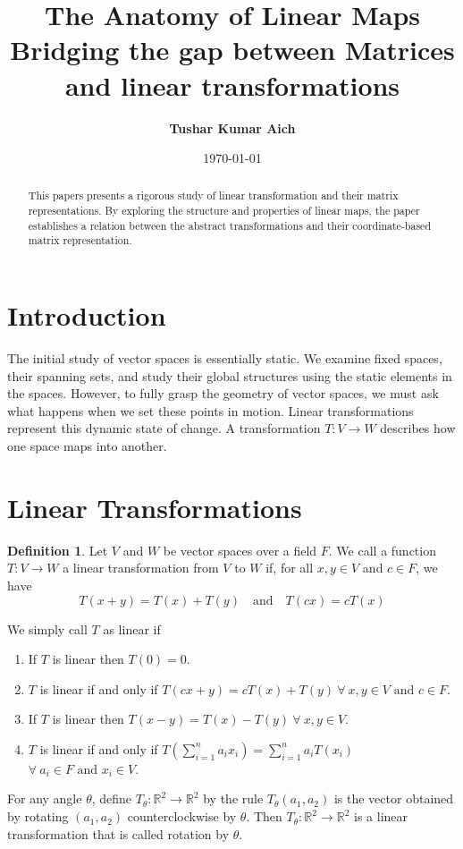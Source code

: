 \documentclass[12pt, a4paper]{article}
\title{\textbf{\Large The Anatomy of Linear Maps \\ \large Bridging the gap between Matrices and linear transformations}}
\author{\textbf{Tushar Kumar Aich}}
\date{\today}
\theoremstyle{definition}
\newtheorem{definition}{Definition}[section]
\theoremstyle{remark}
\begin{document}
\maketitle

\begin{abstract}
    This papers presents a rigorous study of linear transformation and their matrix representations. By exploring the structure and properties of linear maps, the paper establishes a relation between the abstract transformations and their coordinate-based matrix representation.
\end{abstract}

\section{Introduction}
The initial study of vector spaces is essentially static. We examine fixed spaces, their spanning sets, and study their global structures using the static elements in the spaces. However, to fully grasp the geometry of vector spaces, we must ask what happens when we set these points in motion. Linear transformations represent this dynamic state of change. A transformation $T: V \to W$ describes how one space maps into another.

\section{Linear Transformations}
\begin{definition}
    Let $V$ and $W$ be vector spaces over a field $F$. We call a function $T:V \to W$ a linear transformation from $V$ to $W$ if, for all $x,y \in V$ and $c \in F$, we have
    \[
    T(x+y) = T(x)+T(y) \quad \text{and} \quad T(cx) = c T(x)
    \]
\end{definition}
We simply call $T$ as linear if
\begin{enumerate}
    \item If $T$ is linear then $T(0)=0$.
    \item $T$ is linear if and only if $T(cx+y)=cT(x)+T(y) \ \forall \ x,y \in V \text{ and } c \in F$.
    \item If $T$ is linear then $T(x-y)=T(x)-T(y) \ \forall \ x,y \in V$.
    \item $T$ is linear if and only if $T\left(\displaystyle\sum_{i=1}^n a_ix_i\right) = \displaystyle\sum_{i=1}^n a_iT(x_i)$ $\forall \ a_i \in F \text{ and } x_i \in V$.
\end{enumerate}

For any angle $\theta$, define $T_{\theta}:\mathbb{R}^2 \to \mathbb{R}^2$ by the rule $T_\theta(a_1,a_2)$ is the vector obtained by rotating $(a_1,a_2)$ counterclockwise by $\theta$. Then $T_{\theta}:\mathbb{R}^2 \to \mathbb{R}^2$ is a linear transformation that is called rotation by $\theta$.
\end{document}
